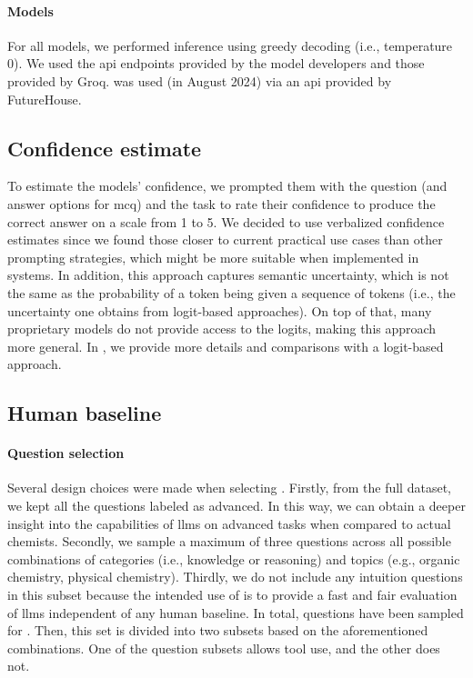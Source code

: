 \documentclass[11pt, oneside]{article}
\begin{document}
\begin{refsegment}
\paragraph{Models}
For all models, we performed inference using greedy decoding (i.e., temperature 0). We used the \gls{api} endpoints provided by the model developers and those provided by Groq. \PaperQATwo was used (in August 2024) via an \gls{api} provided by FutureHouse.

\subsection{Confidence estimate}
To estimate the models' confidence, we prompted them with the question (and answer options for \gls{mcq}) and the task to rate their confidence to produce the correct answer on a scale from 1 to 5.
We decided to use verbalized confidence estimates\autocite{xiong2023llms} since we found those closer to current practical use cases than other prompting strategies, which might be more suitable when implemented in systems. In addition, this approach captures semantic uncertainty, which is not the same as the probability of a token being given a sequence of tokens (i.e., the uncertainty one obtains from logit-based approaches). On top of that, many proprietary models do not provide access to the logits, making this approach more general.
In , we provide more details and comparisons with a logit-based approach.

\subsection{Human baseline}

\paragraph{Question selection} \label{sec:subset-selection}

 Several design choices were made when selecting \chembenchmini. Firstly, from the full dataset, we kept all the questions labeled as advanced. In this way, we can obtain a deeper insight into the capabilities of \glspl{llm} on advanced tasks when compared to actual chemists. Secondly, we sample a maximum of three questions across all possible combinations of categories (i.e., knowledge or reasoning) and topics (e.g., organic chemistry, physical chemistry). Thirdly, we do not include any intuition questions in this subset because the intended use of \chembenchmini is to provide a fast and fair evaluation of \glspl{llm} independent of any human baseline. In total,  questions have been sampled for \chembenchmini. Then, this set is divided into two subsets based on the aforementioned combinations. One of the question subsets allows tool use, and the other does not.


\end{refsegment}
\end{document}
